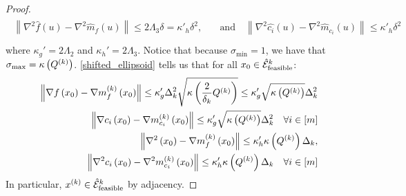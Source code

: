 \begin{proof}
\begin{align*}
\begin{array}{cc}
\left\|\nabla^2 \hat {f}\left(u\right) - \nabla^2 \hat{m}_f\left(u\right) \right\|\le 2\Lambda_3 \delta = {\kappa'}_h\delta^2, &
\quad \textrm{and} \quad \left\|\nabla^2 \hat {c_i}\left(u\right) - \nabla^2 \hat{m}_{c_i}\left(u\right) \right\|\le {\kappa'}_h\delta^2 \\
\end{array}
\end{align*}
where $\kappa_{g}' = 2 \Lambda_2$ and $\kappa_{h}' = 2\Lambda_3$.
Notice that because $\sigma_{\textrm{min}} = 1$, we have that ${\sigma_{\textrm{max}}} = {\kappa} \left({Q^{(k)}}\right)$.
\cref{shifted_ellipsoid} tells us that for all $x_0 \in {{\mathcal {\hat E}_{\text{feasible}}}^k}$:
\begin{align*}
\left\|\nabla f\left(x_0 \right) - \nabla m^{(k)}_f\left(x_0\right)\right\| \le 
\kappa'_g  \Delta_k^2 \sqrt{{\kappa} \left(\frac 2 {\delta_k} {Q^{(k)}}\right)} \le \kappa'_g \sqrt{{\kappa} \left({Q^{(k)}}\right)}\Delta_k^2 \\
\left\|\nabla {c_i}\left(x_0 \right) - \nabla m^{(k)}_{c_i}\left(x_0\right)\right\| \le \kappa'_g\sqrt{{\kappa} \left({Q^{(k)}}\right)} \Delta_k^2 \quad \forall i \in [m] \\
\left\|\nabla^2\left(x_0 \right) - \nabla m^{(k)}_f\left(x_0\right)\right\| \le \kappa'_h {\kappa} \left({Q^{(k)}}\right)\Delta_k, \\
\left\|\nabla^2 {c_i}\left(x_0 \right) - \nabla^2 m^{(k)}_{c_i}\left(x_0\right)\right\| \le \kappa'_h {\kappa} \left({Q^{(k)}}\right)\Delta_k \quad \forall i \in [m]
\end{align*}
In particular, $x^{(k)} \in {{\mathcal {\hat E}_{\text{feasible}}}^k}$ by adjacency.
\end{proof}



